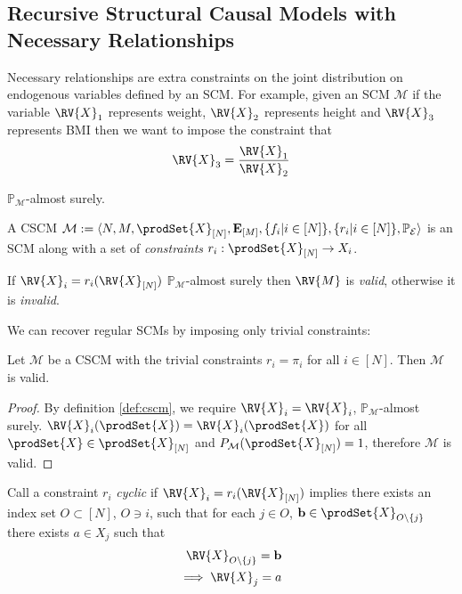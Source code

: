 \subsection{Recursive Structural Causal Models with Necessary Relationships}

Necessary relationships are extra constraints on the joint distribution on endogenous variables defined by an SCM. For example, given an SCM $\mathcal{M}$ if the variable $\RV{X}_1$ represents weight, $\RV{X}_2$ represents height and $\RV{X}_3$ represents BMI then we want to impose the constraint that
\begin{align}
    \RV{X}_3 = \frac{\RV{X}_1}{\RV{X}_2}
\end{align}

$\mathbb{P}_{\mathcal{M}}$-almost surely.

\begin{definition}\label{def:cscm}
    A CSCM $\mathcal{M}:= \langle N,M,\prodSet{X}_{[N]},\mathbf{E}_{[M]},\{f_i|i\in[N]\},\{r_i|i\in [N]\},\mathbb{P}_{\mathcal{E}}\rangle$ is an SCM along with a set of \emph{constraints} $r_i:\prodSet{X}_{[N]}\to X_i$. 

    If $\RV{X}_i=r_i(\RV{X}_{[N]})$ $\mathbb{P}_{\mathcal{M}}$-almost surely then $\RV{M}$ is \emph{valid}, otherwise it is \emph{invalid}.
\end{definition}

We can recover regular SCMs by imposing only trivial constraints:

\begin{lemma}
    Let $\mathcal{M}$ be a CSCM with the trivial constraints $r_i=\pi_i$ for all $i\in[N]$. Then $\mathcal{M}$ is valid.
\end{lemma}

\begin{proof}
    By definition \ref{def:cscm}, we require $\RV{X}_i = \RV{X}_i$, $\mathbb{P}_{\mathcal{M}}$-almost surely. $\RV{X}_i(\prodSet{X}) = \RV{X}_i(\prodSet{X})$ for all $\prodSet{X}\in\prodSet{X}_{[N]}$ and $P_\mathcal{M}(\prodSet{X}_{[N]})=1$, therefore $\mathcal{M}$ is valid.
\end{proof}

Call a constraint $r_i$ \emph{cyclic} if $\RV{X}_i = r_i(\RV{X}_{[N]})$ implies there exists an index set $O\subset[N]$, $O\ni i$, such that for each $j\in O$, $\mathbf{b}\in \prodSet{X}_{O\setminus\{j\}}$ there exists $a\in X_j$ such that
\begin{align}
    \RV{X}_{O\setminus \{j\}} = \mathbf{b}\\
    \implies \RV{X}_j = a
\end{align}

